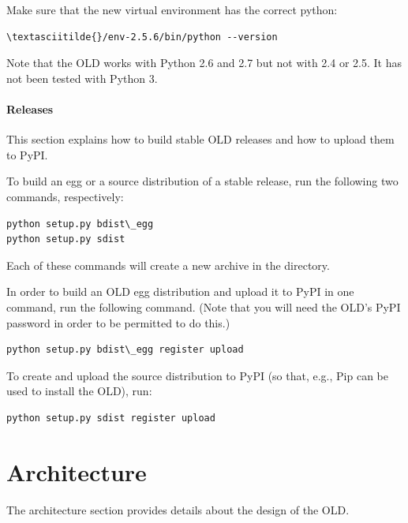 \documentclass[letterpaper,10pt,english]{sphinxmanual}
\begin{document}
Make sure that the new virtual environment has the correct python:

\begin{Verbatim}[commandchars=\\\{\}]
\textasciitilde{}/env-2.5.6/bin/python --version
\end{Verbatim}

Note that the OLD works with Python 2.6 and 2.7 but not with 2.4 or 2.5.  It has
not been tested with Python 3.


\subsubsection{Releases}
\label{installation:releases}
This section explains how to build stable OLD releases and how to upload them to
PyPI.

To build an egg or a source distribution of a stable release, run the following
two commands, respectively:

\begin{Verbatim}[commandchars=\\\{\}]
python setup.py bdist\_egg
python setup.py sdist
\end{Verbatim}

Each of these commands will create a new archive in the  directory.

In order to build an OLD egg distribution and upload it to PyPI in one command,
run the following command.  (Note that you will need the OLD's PyPI password in
order to be permitted to do this.)

\begin{Verbatim}[commandchars=\\\{\}]
python setup.py bdist\_egg register upload
\end{Verbatim}

To create and upload the source distribution to PyPI (so that, e.g., Pip can be
used to install the OLD), run:

\begin{Verbatim}[commandchars=\\\{\}]
python setup.py sdist register upload
\end{Verbatim}


\chapter{Architecture}
\label{index:architecture}\label{index:the-pylons-book}
The architecture section provides details about the design of the OLD.
\end{document}
